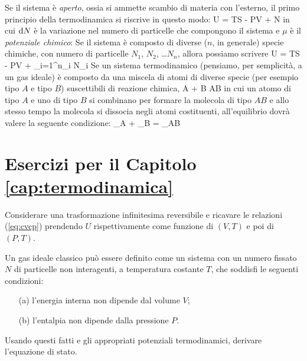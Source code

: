 Se il sistema è {\em aperto}, ossia si ammette scambio di materia con l'esterno, il primo principio della termodinamica si riscrive in questo modo:
\be
\de U = T\de S - P\de V + \mu \de N
\ee
in cui ${\textrm d}N$ è la variazione nel numero di particelle che compongono il sistema e $\mu$ è il {\em potenziale chimico}:
\be
\label{eq:mu}
\mu \equiv {}
\ee
Se il sistema è composto di diverse ($n$, in generale) specie chimiche, con numero di particelle $N_1$, $N_2$, \dots $N_n$, allora possiamo scrivere
\be
\de U = T\de S - P\de V + \sum_{i=1}^{n}\mu_i N_i
\ee
Se un sistema termodinamico (pensiamo, per semplicità, a un gas ideale) è composto da una miscela di atomi di diverse specie (per esempio tipo $A$ e tipo $B$) suscettibili di reazione chimica,
\be
A + B \rightleftharpoons AB
\ee
in cui un atomo di tipo $A$ e uno di tipo $B$ si combinano per formare la molecola di tipo $AB$ e allo stesso tempo la molecola si dissocia negli atomi costituenti, all'equilibrio dovrà valere la seguente condizione:
\be
\mu_A + \mu_B = \mu_{AB}
\ee

\section{Esercizi per il Capitolo \ref{cap:termodinamica}}
\label{sec1:esercizi}

\begin{Exercise}[title={$C_V$ e $C_P$}, label={ex1:cvcp1}]
Considerare una trasformazione infinitesima reversibile e ricavare le relazioni (\ref{eq:cvcp}) prendendo $U$ rispettivamente come funzione di $(V,T)$ e poi di $(P,T)$.
\end{Exercise}


\begin{Exercise}[title={Equazione di stato},label={ex1:PVNkT}]
Un gas ideale classico può essere definito come un sistema con un numero fissato $N$ di particelle non interagenti, a temperatura costante $T$, che soddisfi le seguenti condizioni:
\begin{itemize}
\item[(a)] l'energia interna non dipende dal volume $V$;
\item[(b)] l'entalpia non dipende dalla pressione $P$.
\end{itemize}
Usando questi fatti e gli appropriati potenziali termodinamici, derivare l'equazione di stato.
\end{Exercise}

